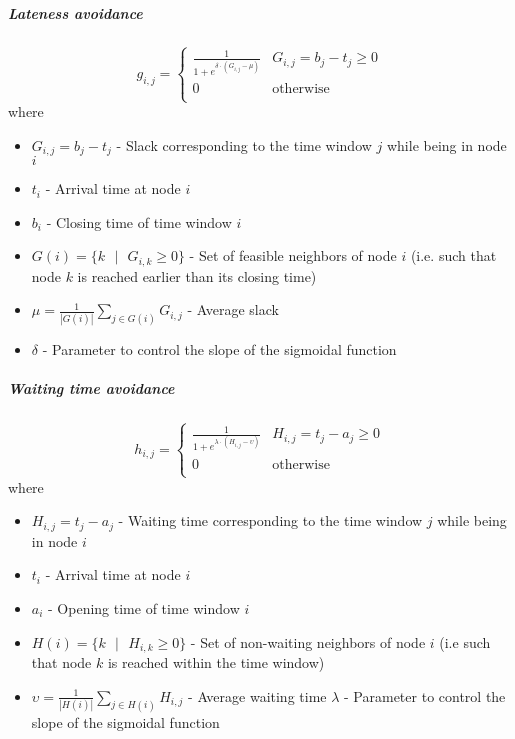 \begin{homeworkProblem}
\subparagraph{Lateness avoidance}
\begin{equation}
g_{i,j} = \begin{cases}
 \frac{1}{1+e^{\delta \cdot (G_{i,j} - \mu)}}  &  G_{i,j} = b_j - t_j \geq 0 \\
0 & \text{otherwise} \\
\end{cases}
\end{equation}
where
\begin{itemize}
  \item $G_{i,j} = b_j - t_j$ - Slack corresponding to the time window $j$ while being in node $i$
  \item $t_i$ - Arrival time at node $i$
  \item $b_i$ - Closing time of time window $i$
  \item $G(i) = \{k\text{ } | \text{ }G_{i,k} \geq 0\}$ - Set of feasible neighbors of node $i$ (i.e. such that node $k$ is reached earlier than its closing time)
  \item $\mu = \frac{1}{|G(i)|}\sum_{j \in G(i)}  G_{i,j}$ - Average slack 
  \item $\delta$ - Parameter to control the slope of the sigmoidal function
\end{itemize}

\subparagraph{Waiting time avoidance}
\begin{equation}
h_{i,j} = \begin{cases}
 \frac{1}{1+e^{\lambda \cdot (H_{i,j} - \upsilon)}}  &  H_{i,j} = t_j - a_j \geq 0 \\
0 & \text{otherwise} \\
\end{cases}
\end{equation}
where
\begin{itemize}
  \item $H_{i,j} = t_j - a_j$ - Waiting time corresponding to the time window $j$ while being in node $i$
  \item $t_i$ - Arrival time at node $i$
  \item $a_i$ - Opening time of time window $i$
  \item $H(i) = \{k\text{ } | \text{ }H_{i,k} \geq 0\}$ - Set of non-waiting neighbors of node $i$ (i.e such that node $k$ is reached within the time window)
  \item $\upsilon = \frac{1}{|H(i)|}\sum_{j \in H(i)}  H_{i,j}$ - Average waiting time 
  $\lambda$ - Parameter to control the slope of the sigmoidal function 
\end{itemize}



\end{homeworkProblem}
